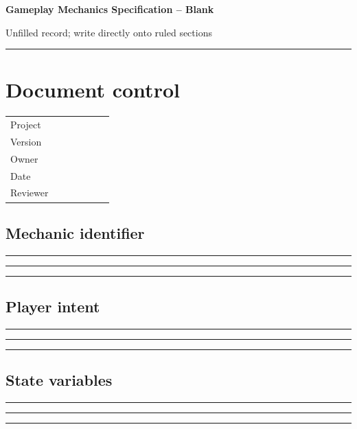 \documentclass[11pt]{article}
\begin{document}
{\huge\bfseries\color{suiteblue} Gameplay Mechanics Specification -- Blank}\par
\vspace{0.15in}
{\normalsize\color{suitegray} Unfilled record; write directly onto ruled sections}\par
\vspace{0.15in}\hrule\vspace{0.15in}

\section{Document control}
\renewcommand{\arraystretch}{1.8}
\begin{tabularx}{\linewidth}{@{}p{0.30\linewidth}X@{}}\toprule
Project & \hrulefill\\ Version & \hrulefill\\ Owner & \hrulefill\\ Date & \hrulefill\\ Reviewer & \hrulefill\\ \bottomrule\end{tabularx}

\subsection{Mechanic identifier}
\noindent\rule{\linewidth}{0.3pt}\par\vspace{0.18in}
\noindent\rule{\linewidth}{0.3pt}\par\vspace{0.18in}
\noindent\rule{\linewidth}{0.3pt}\par\vspace{0.14in}

\subsection{Player intent}
\noindent\rule{\linewidth}{0.3pt}\par\vspace{0.18in}
\noindent\rule{\linewidth}{0.3pt}\par\vspace{0.18in}
\noindent\rule{\linewidth}{0.3pt}\par\vspace{0.14in}

\subsection{State variables}
\noindent\rule{\linewidth}{0.3pt}\par\vspace{0.18in}
\noindent\rule{\linewidth}{0.3pt}\par\vspace{0.18in}
\noindent\rule{\linewidth}{0.3pt}\par\vspace{0.14in}
\end{document}
